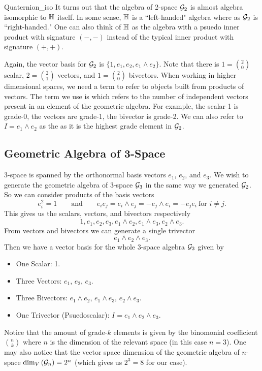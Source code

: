 \begin{remark}{}{Quaternion_iso}
It turns out that the algebra of 2-space $\mathcal{G}_2$ is almost algebra isomorphic to $\mathbb{H}$ itself.  In some sense, $\mathbb{H}$ is a ``left-handed" algebra where as $\mathcal{G}_2$ is ``right-handed." One can also think of $\mathbb{H}$ as the algebra with a psuedo inner product with signature $(-,-)$ instead of the typical inner product with signature $(+,+)$.
\end{remark}

Again, the vector basis for $\mathcal{G}_2$ is $\{1,e_1,e_2,e_1\wedge e_2\}$. Note that there is $1 = \binom{2}{0}$ scalar, $2=\binom{2}{1}$ vectors, and $1=\binom{2}{0}$ bivectors. When working in higher dimensional spaces, we need a term to refer to objects built from products of vectors.  The term we use is  which refers to the number of independent vectors present in an element of the geometric algebra.  For example, the scalar 1 is grade-0, the vectors are grade-1, the bivector is grade-2. We can also refer to $I=e_1\wedge e_2$ as the  as it is the highest grade element in $\mathcal{G}_2$.

\subsection{Geometric Algebra of 3-Space}
3-space is spanned by the orthonormal basis vectors $e_1$, $e_2$, and $e_3$.  We wish to generate the geometric algebra of 3-space $\mathcal{G}_3$ in the same way we generated $\mathcal{G}_2$.  So we can consider products of the basis vectors
\[
e_i^2 = 1 \qquad \textrm{and} \qquad e_ie_j = e_i\wedge e_j = -e_j\wedge e_i = -e_je_i ~\textrm{for $i\neq j$}.
\]
This gives us the scalars, vectors, and bivectors respectively
\[
1,e_1,e_2,e_3,e_1\wedge e_2, e_1\wedge e_3,e_2\wedge e_3.
\]
From vectors and bivectors we can generate a single trivector
\[
e_1\wedge e_2 \wedge e_3.
\]
Then we have a vector basis for the whole 3-space algebra $\mathcal{G}_3$ given by
\begin{itemize}
    \item One Scalar: 1.
    \item Three Vectors: $e_1$, $e_2$, $e_3$.
    \item Three Bivectors: $e_1\wedge e_2$, $e_1 \wedge e_3$, $e_2\wedge e_3$.
    \item One Trivector (Psuedoscalar): $I=e_1\wedge e_2 \wedge e_3$.
\end{itemize}
Notice that the amount of grade-$k$ elements is given by the binomonial coefficient $\binom{n}{k}$ where $n$ is the dimension of the relevant space (in this case $n=3$). One may also notice that the vector space dimension of the geometric algebra of $n$-space $\dim_V\left( \mathcal{G}_n\right) = 2^n$ (which gives us $2^3=8$ for our case).

